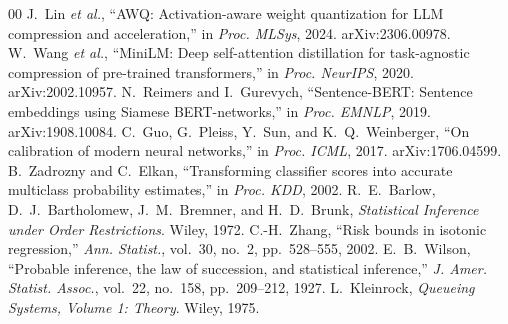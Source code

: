 \documentclass[conference]{IEEEtran}
\begin{document}
\begin{thebibliography}{00}
 J.~Lin \emph{et al.}, ``AWQ: Activation-aware weight quantization for LLM compression and acceleration,'' in \emph{Proc. MLSys}, 2024. arXiv:2306.00978.
 W.~Wang \emph{et al.}, ``MiniLM: Deep self-attention distillation for task-agnostic compression of pre-trained transformers,'' in \emph{Proc. NeurIPS}, 2020. arXiv:2002.10957.
 N.~Reimers and I.~Gurevych, ``Sentence-BERT: Sentence embeddings using Siamese BERT-networks,'' in \emph{Proc. EMNLP}, 2019. arXiv:1908.10084.
 C.~Guo, G.~Pleiss, Y.~Sun, and K.~Q.~Weinberger, ``On calibration of modern neural networks,'' in \emph{Proc. ICML}, 2017. arXiv:1706.04599.
 B.~Zadrozny and C.~Elkan, ``Transforming classifier scores into accurate multiclass probability estimates,'' in \emph{Proc. KDD}, 2002.
 R.~E.~Barlow, D.~J.~Bartholomew, J.~M.~Bremner, and H.~D.~Brunk, \emph{Statistical Inference under Order Restrictions}. Wiley, 1972.
 C.-H.~Zhang, ``Risk bounds in isotonic regression,'' \emph{Ann. Statist.}, vol.~30, no.~2, pp.~528--555, 2002.
 E.~B.~Wilson, ``Probable inference, the law of succession, and statistical inference,'' \emph{J. Amer. Statist. Assoc.}, vol.~22, no.~158, pp.~209--212, 1927.
 L.~Kleinrock, \emph{Queueing Systems, Volume 1: Theory}. Wiley, 1975.
\end{thebibliography}
\end{document}

